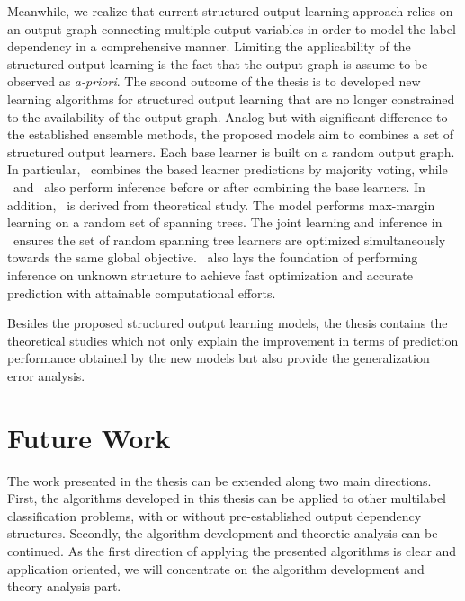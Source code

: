 {Meanwhile, we realize that current structured output learning approach relies on an output graph connecting multiple output variables in order to model the label dependency in a comprehensive manner.
Limiting the applicability of the structured output learning is the fact that the output graph is assume to be observed as \textit{a-priori}.
The second outcome of the thesis is to developed new learning algorithms for structured output learning that are no longer constrained to the availability of the output graph.
Analog but with significant difference to the established ensemble methods, the proposed models aim to combines a set of structured output learners.
Each base learner is built on a random output graph.
In particular, \mve\ combines the based learner predictions by majority voting, while \amm\ and \mam\ also perform inference before or after combining the base learners.
In addition, \rta\ is derived from theoretical study.
The model performs max-margin learning on a random set of spanning trees.
The joint learning and inference in \rta\ ensures the set of random spanning tree learners are optimized simultaneously towards the same global objective.
\rta\ also lays the foundation of performing inference on unknown structure to achieve fast optimization and accurate prediction with attainable computational efforts.

Besides the proposed structured output learning models, the thesis contains the theoretical studies which not only explain the improvement in terms of prediction performance obtained by the new models but also provide the generalization error analysis.


\section{Future Work}

The work presented in the thesis can be extended along two main directions.
First, the algorithms developed in this thesis can be applied to other multilabel classification problems, with or without pre-established output dependency structures.
Secondly, the algorithm development and theoretic analysis can be continued.
As the first direction of applying the presented algorithms is clear and application oriented, we will concentrate on the algorithm development and theory analysis part.

}
